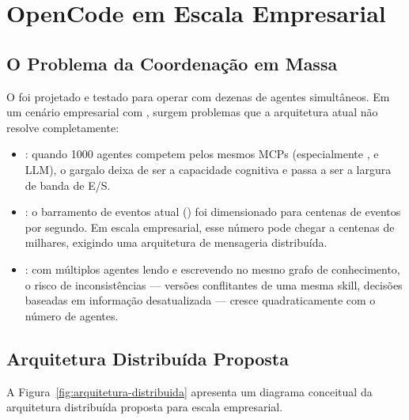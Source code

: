 \section{OpenCode em Escala Empresarial}
\label{sec:escala-empresarial}
\nivelavancado

\subsection{O Problema da Coordenação em Massa}

O \opencodeeco{} foi projetado e testado para operar com dezenas de
agentes simultâneos. Em um cenário empresarial com , surgem problemas que a arquitetura atual não
resolve completamente:

\begin{itemize}
    \item {}: quando 1000 agentes
    competem pelos mesmos MCPs (especialmente ,
     e LLM), o gargalo deixa de ser a capacidade
    cognitiva e passa a ser a largura de banda de E/S.

    \item {}: o barramento de eventos
    atual () foi dimensionado para
    centenas de eventos por segundo. Em escala empresarial, esse
    número pode chegar a centenas de milhares, exigindo uma
    arquitetura de mensageria distribuída.

    \item {}: com múltiplos agentes
    lendo e escrevendo no mesmo grafo de conhecimento, o risco de
    inconsistências --- versões conflitantes de uma mesma skill,
    decisões baseadas em informação desatualizada --- cresce
    quadraticamente com o número de agentes.
\end{itemize}

\subsection{Arquitetura Distribuída Proposta}

A Figura~\ref{fig:arquitetura-distribuida} apresenta um diagrama
conceitual da arquitetura distribuída proposta para escala empresarial.

